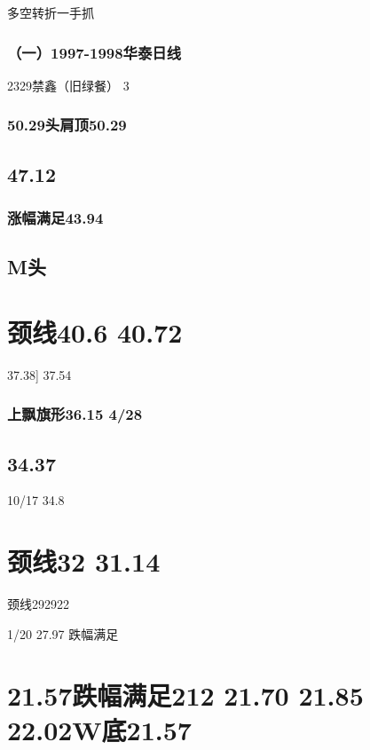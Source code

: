 \documentclass{article}
\begin{document}
\clearpage

多空转折一手抓

\subsubsection{（一）1997-1998华泰日线}

2329禁鑫（旧绿餐） 3

\subsubsection{50.29头肩顶50.29}

\subsection{47.12}

\subsubsection{涨幅满足43.94}

\subsection{M头}

\section{颈线40.6 40.72}

37.38] 37.54

\subsubsection{上飘旗形36.15 4/28}

\subsection{34.37}

10/17 34.8

\section{颈线32 31.14}

颈线292922

1/20 27.97 跌幅满足

\section{21.57跌幅满足212 21.70 21.85 22.02W底21.57}
\end{document}
